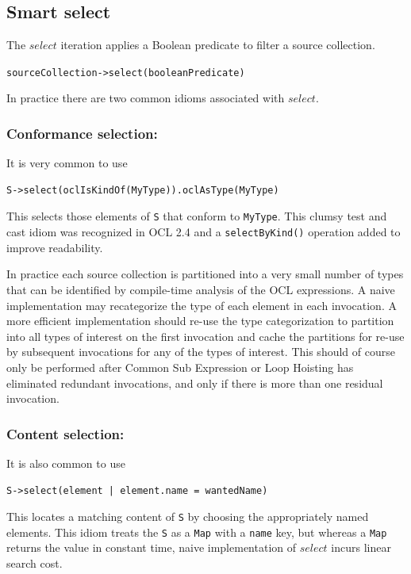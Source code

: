 \documentclass{llncs}
\begin{document}
\subsection{Smart select}

The $select$ iteration applies a Boolean predicate to filter a source collection.

\verb$sourceCollection->select(booleanPredicate)$

In practice there are two common idioms associated with $select$.

\subsubsection{Conformance selection:}

It is very common to use

\begin{verbatim}
S->select(oclIsKindOf(MyType)).oclAsType(MyType)
\end{verbatim}

This selects those elements of \verb$S$ that conform to \verb$MyType$. This clumsy test and cast idiom was recognized in OCL 2.4 and a \verb$selectByKind()$ operation added to improve readability.

In practice each source collection is partitioned into a very small number of types that can be identified by compile-time analysis of the OCL expressions. A naive implementation may recategorize the type of each element in each invocation. A more efficient implementation should re-use the type categorization to partition into all types of interest on the first invocation and cache the partitions for re-use by subsequent invocations for any of the types of interest. This should of course only be performed after Common Sub Expression or Loop Hoisting has eliminated redundant invocations, and only if there is more than one residual invocation.

\subsubsection{Content selection:}

It is also common to use

\begin{verbatim}
S->select(element | element.name = wantedName)
\end{verbatim}

This locates a matching content of \verb$S$ by choosing the appropriately named elements. This idiom treats the \verb$S$ as a \verb$Map$ with a \verb$name$ key, but whereas a \verb$Map$ returns the value in constant time, naive implementation of $select$ incurs linear search cost.
\end{document}
